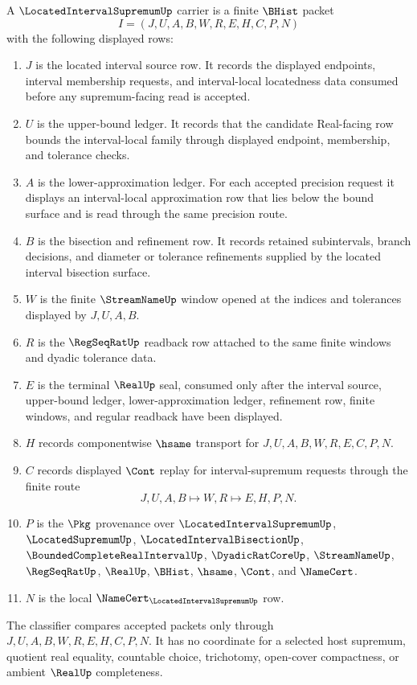 \begin{definition}
\label{def:located-interval-supremum-carrier}
A $\LocatedIntervalSupremumUp$ carrier is a finite $\BHist$ packet
$$
I=(J,U,A,B,W,R,E,H,C,P,N)
$$
with the following displayed rows:
\begin{enumerate}
\item $J$ is the located interval source row. It records the displayed endpoints, interval membership requests, and interval-local locatedness data consumed before any supremum-facing read is accepted.
\item $U$ is the upper-bound ledger. It records that the candidate Real-facing row bounds the interval-local family through displayed endpoint, membership, and tolerance checks.
\item $A$ is the lower-approximation ledger. For each accepted precision request it displays an interval-local approximation row that lies below the bound surface and is read through the same precision route.
\item $B$ is the bisection and refinement row. It records retained subintervals, branch decisions, and diameter or tolerance refinements supplied by the located interval bisection surface.
\item $W$ is the finite $\StreamNameUp$ window opened at the indices and tolerances displayed by $J,U,A,B$.
\item $R$ is the $\RegSeqRatUp$ readback row attached to the same finite windows and dyadic tolerance data.
\item $E$ is the terminal $\RealUp$ seal, consumed only after the interval source, upper-bound ledger, lower-approximation ledger, refinement row, finite windows, and regular readback have been displayed.
\item $H$ records componentwise $\hsame$ transport for $J,U,A,B,W,R,E,C,P,N$.
\item $C$ records displayed $\Cont$ replay for interval-supremum requests through the finite route
$$
J,U,A,B \longmapsto W,R \longmapsto E,H,P,N .
$$
\item $P$ is the $\Pkg$ provenance over $\LocatedIntervalSupremumUp$, $\LocatedSupremumUp$, $\LocatedIntervalBisectionUp$, $\BoundedCompleteRealIntervalUp$, $\DyadicRatCoreUp$, $\StreamNameUp$, $\RegSeqRatUp$, $\RealUp$, $\BHist$, $\hsame$, $\Cont$, and $\NameCert$.
\item $N$ is the local $\NameCert_{\LocatedIntervalSupremumUp}$ row.
\end{enumerate}
The classifier compares accepted packets only through $J,U,A,B,W,R,E,H,C,P,N$. It has no coordinate for a selected host supremum, quotient real equality, countable choice, trichotomy, open-cover compactness, or ambient $\RealUp$ completeness.
\end{definition}


